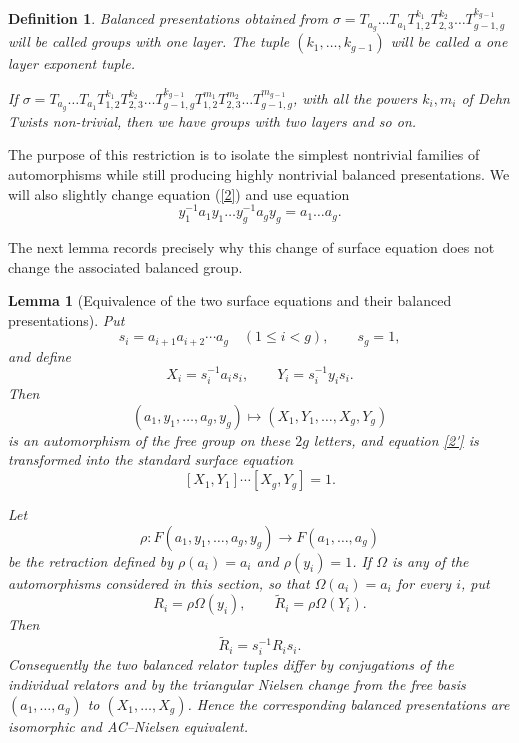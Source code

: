 \documentclass{article}
\newtheorem{lm}[theorem]{Lemma}
\newtheorem{df}[theorem]{Definition}
\begin{document}
\begin{df} \label{onel} Balanced presentations obtained  from  $\sigma =T_{a_g}\ldots T_{a_1}T_{1,2}^{k_1}T_{2,3}^{k_2}\ldots  T_{g-1,g}^{k_{g-1}}$   will be called groups with one layer. The tuple $(k_1,\ldots ,k_{g-1})$ will be called a {\em one layer exponent tuple}.

 If  $\sigma =T_{a_g}\ldots T_{a_1}T_{1,2}^{k_1}T_{2,3}^{k_2}\ldots  T_{g-1,g}^{k_{g-1}}T_{1,2}^{m_1}T_{2,3}^{m_2}\ldots  T_{g-1,g}^{m_{g-1}}$, with all the powers $k_i,m_i$ of Dehn Twists non-trivial, then we have groups with two layers and so on.
\end{df} 
The purpose of this restriction is to isolate the simplest nontrivial families
of automorphisms while still producing highly nontrivial balanced
presentations. We will also slightly change equation (\ref{2}) and use equation
 \begin{equation}\label{2'}
 y_1^{-1}a_1y_1\ldots y_g^{-1}a_gy_g=a_1\ldots a_g.
 \end{equation}

The next lemma records precisely why this change of surface equation does not
change the associated balanced group.

\begin{lm}[Equivalence of the two surface equations and their balanced presentations]
\label{lem:equivalent-surface-equations}
Put
\[
 s_i=a_{i+1}a_{i+2}\cdots a_g\quad(1\leq i<g),
 \qquad s_g=1,
\]
and define
\[
 X_i=s_i^{-1}a_i s_i,
 \qquad
 Y_i=s_i^{-1}y_i s_i.
\]
Then
\[
 (a_1,y_1,\ldots,a_g,y_g)
 \longmapsto
 (X_1,Y_1,\ldots,X_g,Y_g)
\]
is an automorphism of the free group on these $2g$ letters, and equation
\eqref{2'} is transformed into the standard surface equation
\[
 [X_1,Y_1]\cdots[X_g,Y_g]=1.
\]

Let
\[
 \rho:F(a_1,y_1,\ldots,a_g,y_g)
 \longrightarrow F(a_1,\ldots,a_g)
\]
be the retraction defined by $\rho(a_i)=a_i$ and $\rho(y_i)=1$.  If
$\Omega$ is any of the automorphisms considered in this section, so that
$\Omega(a_i)=a_i$ for every $i$, put
\[
 R_i=\rho\Omega(y_i),
 \qquad
 \widetilde R_i=\rho\Omega(Y_i).
\]
Then
\[
 \widetilde R_i=s_i^{-1}R_i s_i.
\]
Consequently the two balanced relator tuples differ by conjugations of the
individual relators and by the triangular Nielsen change from the free basis
$(a_1,\ldots,a_g)$ to $(X_1,\ldots,X_g)$.  Hence the corresponding balanced
presentations are isomorphic and AC--Nielsen
equivalent.
\end{lm}
\end{document}
